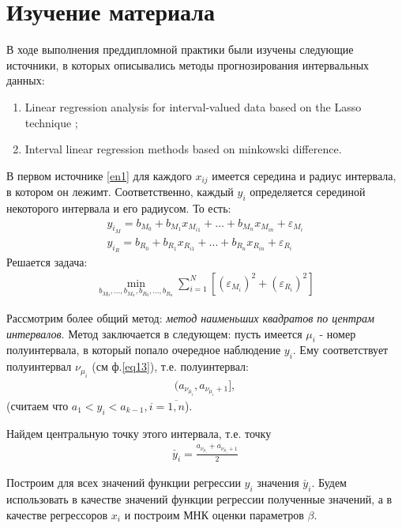 

\section{Изучение материала}
В ходе выполнения преддипломной практики были изучены следующие источники, в которых описывались методы прогнозирования интервальных данных:
\begin{enumerate}
    \item \label{en1}Linear regression analysis for interval-valued data based on the Lasso technique \cite{interval_valued};
    \item \label{en2}Interval linear regression methods based on minkowski difference. \cite{minkowski}
\end{enumerate}

В первом источнике \ref{en1} для каждого $x_{ij}$ имеется середина  и радиус интервала, в котором он лежимт. Соответственно, каждый $y_i$ определяется серединой некоторого интервала и его радиусом.
То есть:
\begin{eqnarray}
    y_{i_M} = b_{M_0} + b_{M_1} x_{M_{i1}} + \dots + b_{M_n} x_{M_{in}} + \varepsilon_{M_i}\\
    y_{i_R} = b_{R_0} + b_{R_1} x_{R_{i1}} + \dots + b_{R_n} x_{R_{in}} + \varepsilon_{R_i}
\end{eqnarray} 
Решается задача:
\begin{eqnarray}
    \min_{b_{M_0},\dots,b_{M_n},b_{R_0}, \dots, b_{R_n}} \sum\limits_{i=1}^N [(\varepsilon_{M_i})^2 + (\varepsilon_{R_i})^2]
\end{eqnarray}

Рассмотрим более общий метод: \textit{метод наименьших квадратов по центрам интервалов}.
Метод заключается в следующем:
пусть имеется $\mu_i$ - номер полуинтервала, в который попало очередное наблюдение $y_i$. Ему соответствует полуинтервал $\nu_{\mu_i}$ (см ф.\ref{eq13}), т.е. полуинтервал:
\begin{eqnarray}
    (a_{\nu_{\mu_i}},a_{\nu_{\mu_i}+1}],
\end{eqnarray}
(считаем что $a_1<y_i<a_{k-1}, i=\overline{1,n}$).

Найдем центральную точку этого интервала, т.е. точку
\begin{eqnarray}
    \check{y_i} = \frac{a_{\nu_{\mu_i}} + a_{\nu_{\mu_i}+1}}{2}
\end{eqnarray}

Построим для всех значений функции регрессии $y_i$ значения $\check{y_i}$.
Будем использовать в качестве значений функции регрессии полученные значений, а в качестве регрессоров $x_i$ и построим МНК оценки параметров $\beta$.

